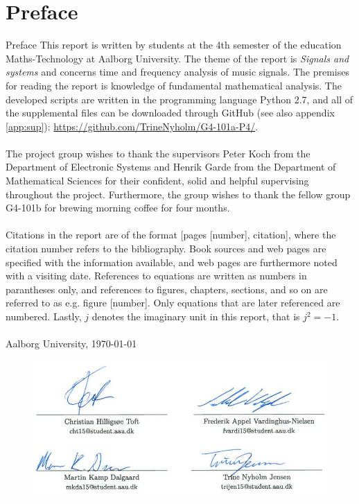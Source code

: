 \clearpage
\chapter*{Preface}
{Preface}
This report is written by students at the 4th semester of the education Maths-Technology at Aalborg University. The theme of the report is \textit{Signals and systems} and concerns time and frequency analysis of music signals. The premises for reading the report is knowledge of fundamental mathematical analysis. The developed scripts are written in the programming language Python 2.7, and all of the supplemental files can be downloaded through GitHub (see also appendix \ref{app:sup}): \url{https://github.com/TrineNyholm/G4-101a-P4/}.
\\ \\
The project group wishes to thank the supervisors Peter Koch from the Department of Electronic Systems and Henrik Garde from the Department of Mathematical Sciences for their confident, solid and helpful supervising throughout the project. Furthermore, the group wishes to thank the fellow group G4-101b for brewing morning coffee for four months.
\\ \\
Citations in the report are of the format [pages [number], citation], where the citation number refers to the bibliography. Book sources and web pages are specified with the information available, and web pages are furthermore noted with a visiting date. References to equations are written as numbers in parantheses only, and references to figures, chapters, sections, and so on are referred to as e.g. figure [number]. Only equations that are later referenced are numbered. Lastly, $j$ denotes the imaginary unit in this report, that is $j^2 = -1$.
\\ \\
\vspace{\baselineskip}\hfill Aalborg University, \today
\vfill\noindent

\begin{figure}[H]
\centering
\includegraphics[width = \textwidth]{figures/preface.jpg}
\end{figure}